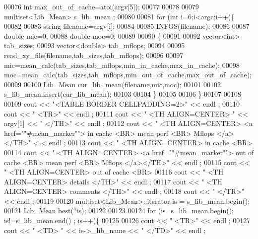 \begin{DoxyCode}
00076   \textcolor{keywordtype}{int} max\_out\_of\_cache=atoi(argv[5]);
00077 
00078 
00079   multiset<Lib\_Mean> s\_lib\_mean ;
00080 
00081   \textcolor{keywordflow}{for} (\textcolor{keywordtype}{int} i=6;i<argc;i++)\{
00082     
00083     \textcolor{keywordtype}{string} filename=argv[i];
00084     
00085     INFOS(filename);
00086 
00087     \textcolor{keywordtype}{double} mic=0;
00088     \textcolor{keywordtype}{double} moc=0;
00089 
00090     \{
00091       
00092       vector<int> tab\_sizes;
00093       vector<double> tab\_mflops;
00094 
00095       read\_xy\_file(filename,tab\_sizes,tab\_mflops);
00096 
00097       mic=mean\_calc(tab\_sizes,tab\_mflops,min\_in\_cache,max\_in\_cache);
00098       moc=mean\_calc(tab\_sizes,tab\_mflops,min\_out\_of\_cache,max\_out\_of\_cache);
00099 
00100       \hyperlink{class_lib___mean}{Lib\_Mean} cur\_lib\_mean(filename,mic,moc);
00101       
00102       s\_lib\_mean.insert(cur\_lib\_mean);  
00103 
00104     \}   
00105            
00106   \}
00107 
00108 
00109   cout << \textcolor{stringliteral}{"<TABLE BORDER CELLPADDING=2>"} << endl ;
00110   cout << \textcolor{stringliteral}{"  <TR>"} << endl ;
00111   cout << \textcolor{stringliteral}{"    <TH ALIGN=CENTER> "} << argv[1] << \textcolor{stringliteral}{" </TH>"} << endl ;
00112   cout << \textcolor{stringliteral}{"    <TH ALIGN=CENTER> <a href="}\textcolor{stringliteral}{"#mean\_marker"}\textcolor{stringliteral}{"> in cache <BR> mean perf <BR> Mflops </a></TH>"} <
      < endl ;
00113   cout << \textcolor{stringliteral}{"    <TH ALIGN=CENTER> in cache <BR> %
00114   cout << \textcolor{stringliteral}{"    <TH ALIGN=CENTER> <a href="}\textcolor{stringliteral}{"#mean\_marker"}\textcolor{stringliteral}{"> out of cache <BR> mean perf <BR> Mflops
       </a></TH>"} << endl ;
00115   cout << \textcolor{stringliteral}{"    <TH ALIGN=CENTER> out of cache <BR> %
00116   cout << \textcolor{stringliteral}{"    <TH ALIGN=CENTER> details </TH>"} << endl ;
00117   cout << \textcolor{stringliteral}{"    <TH ALIGN=CENTER> comments </TH>"} << endl ;
00118   cout << \textcolor{stringliteral}{"  </TR>"} << endl ;
00119 
00120   multiset<Lib\_Mean>::iterator is = s\_lib\_mean.begin();
00121   \hyperlink{class_lib___mean}{Lib\_Mean} best(*is);  
00122   
00123 
00124   \textcolor{keywordflow}{for} (is=s\_lib\_mean.begin(); is!=s\_lib\_mean.end() ; is++)\{
00125 
00126     cout << \textcolor{stringliteral}{"  <TR>"} << endl ;
00127     cout << \textcolor{stringliteral}{"     <TD> "} << is->\_lib\_name << \textcolor{stringliteral}{" </TD>"} << endl ;
}}
\end{DoxyCode}
